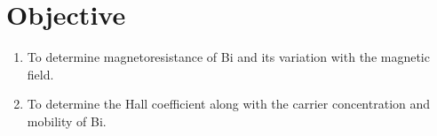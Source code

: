\section{Objective}

\begin{enumerate}
    \item To determine magnetoresistance of Bi and its variation with the magnetic field.
    \item To determine the Hall coefficient along with the carrier concentration and mobility of Bi.
\end{enumerate}
